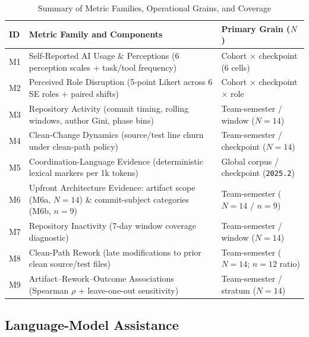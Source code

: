 \begin{table}[t]
\caption{Summary of Metric Families, Operational Grains, and Coverage}
\label{tab:metrics_summary}
\centering
\small
\begin{tabular}{@{}lp{4.1cm}p{3.0cm}@{}}
\toprule
\textbf{ID} & \textbf{Metric Family and Components} & \textbf{Primary Grain ($N$)} \\
\midrule
M1 & Self-Reported AI Usage \& Perceptions (6 perception scales + task/tool frequency) & Cohort $\times$ checkpoint ($6$ cells) \\
\midrule
M2 & Perceived Role Disruption (5-point Likert across 6 SE roles + paired shifts) & Cohort $\times$ checkpoint $\times$ role \\
\midrule
M3 & Repository Activity (commit timing, rolling windows, author Gini, phase bins) & Team-semester / window ($N=14$) \\
\midrule
M4 & Clean-Change Dynamics (source/test line churn under clean-path policy) & Team-semester / checkpoint ($N=14$) \\
\midrule
M5 & Coordination-Language Evidence (deterministic lexical markers per 1k tokens) & Global corpus / checkpoint (\texttt{2025.2}) \\
\midrule
M6 & Upfront Architecture Evidence: artifact scope (M6a, $N=14$) \& commit-subject categories (M6b, $n=9$) & Team-semester ($N=14$ / $n=9$) \\
\midrule
M7 & Repository Inactivity (7-day window coverage diagnostic) & Team-semester / window ($N=14$) \\
\midrule
M8 & Clean-Path Rework (late modifications to prior clean source/test files) & Team-semester ($N=14$; $n=12$ ratio) \\
\midrule
M9 & Artifact--Rework--Outcome Associations (Spearman $\rho$ + leave-one-out sensitivity) & Team-semester / stratum ($N=14$) \\
\bottomrule
\end{tabular}
\end{table}


\subsection{Language-Model Assistance}

